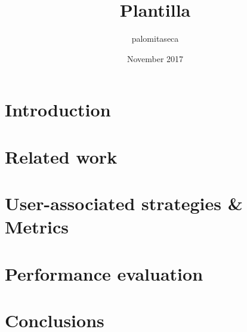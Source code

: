 \documentclass{article}
\title{Plantilla}
\author{palomitaseca }
\date{November 2017}
\begin{document}
\maketitle
\tableofcontents
\section{Introduction}

\section{Related work}
\section{User-associated strategies \& Metrics}
\section{Performance evaluation}
\section{Conclusions}
\end{document}
